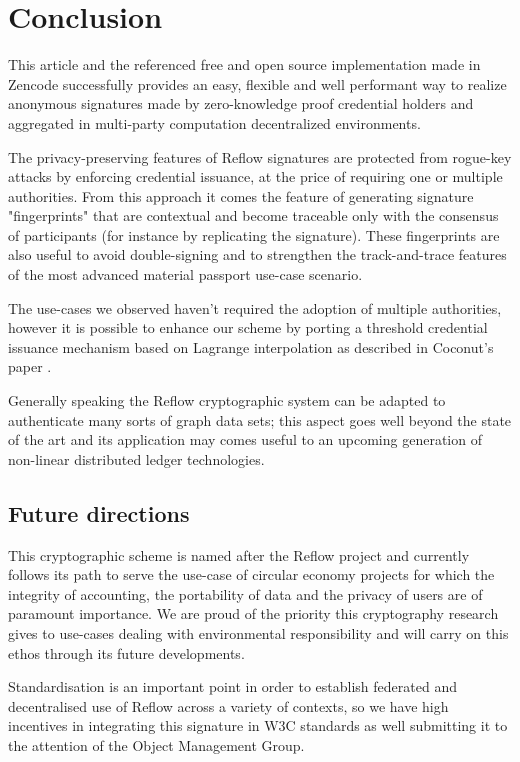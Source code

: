 \documentclass[twocolumn]{article}
\begin{document}
\twocolumn

\section{Conclusion}

This article and the referenced free and open source implementation
made in Zencode successfully provides an easy, flexible and well
performant way to realize anonymous signatures made by zero-knowledge
proof credential holders and aggregated in multi-party computation
decentralized environments.

The privacy-preserving features of Reflow signatures are protected
from rogue-key attacks by enforcing credential issuance, at the price
of requiring one or multiple authorities. From this approach it comes
the feature of generating signature "fingerprints" that are contextual
and become traceable only with the consensus of participants (for
instance by replicating the signature). These fingerprints are also
useful to avoid double-signing and to strengthen the track-and-trace
features of the most advanced material passport use-case scenario.

The use-cases we observed haven't required the adoption of multiple
authorities, however it is possible to enhance our scheme by porting a
threshold credential issuance mechanism based on Lagrange
interpolation as described in Coconut's paper \citep{coconut-2018}.

Generally speaking the Reflow cryptographic system can be adapted to
authenticate many sorts of graph data sets; this aspect goes well
beyond the state of the art and its application may comes useful to an
upcoming generation of non-linear distributed ledger technologies.

\subsection{Future directions}

This cryptographic scheme is named after the Reflow project and currently
follows its path to serve the use-case of circular economy projects
for which the integrity of accounting, the portability of data and the
privacy of users are of paramount importance. We are proud of the
priority this cryptography research gives to use-cases dealing with
environmental responsibility and will carry on this ethos through its
future developments.

Standardisation is an important point in order to establish federated
and decentralised use of Reflow across a variety of contexts, so we have
high incentives in integrating this signature in W3C standards as well
submitting it to the attention of the Object Management Group.
\end{document}
